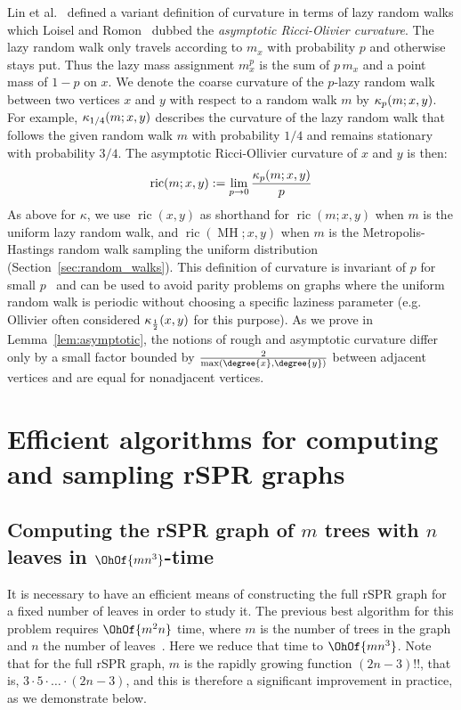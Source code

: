 \documentclass[11pt]{amsart}
\newcommand{\MH}{\operatorname{MH}}
\newcommand{\curvature}[2][]{%
    \ifthenelse{\equal{#1}{}}%
		{\kappa(#2)}%
		{\kappa_{#1}(#2)}%
}
\newcommand{\ric}[1]{
	\operatorname{ric}(#1)%
}
\begin{document}
Lin et al.~\cite{lin2011ricci} defined a variant definition of curvature in terms of lazy random walks which Loisel and Romon~\cite{Loisel2014-hu} dubbed the \emph{asymptotic Ricci-Olivier curvature}.
The lazy random walk only travels according to $m_x$ with probability $p$ and otherwise stays put.
Thus the lazy mass assignment $m^p_x$ is the sum of $p\, m_x$ and a point mass of $1 - p$ on $x$.
We denote the coarse curvature of the $p$-lazy random walk between two vertices $x$ and $y$ with respect to a random walk $m$ by $\curvature[p]{m; x,y}$.
For example, $\curvature[1/4]{m; x,y}$ describes the curvature of the lazy random walk that follows the given random walk $m$ with probability $1/4$ and remains stationary with probability $3/4$.
The asymptotic Ricci-Ollivier curvature of $x$ and $y$ is then:
\begin{equation}
\ric{m; x, y} := \lim_{p \rightarrow 0} \frac{\curvature[p]{m; x,y}}{p}
\label{eq:asympCurvatureDef}
\end{equation}
As above for $\kappa$, we use $\ric{x, y}$ as shorthand for $\ric{m; x, y}$ when $m$ is the uniform lazy random walk, and $\ric{\MH; x, y}$ when $m$ is the Metropolis-Hastings random walk sampling the uniform distribution (Section~\ref{sec:random_walks}).
This definition of curvature is invariant of $p$ for small $p$~\cite{Loisel2014-hu} and can be used to avoid parity problems on graphs where the uniform random walk is periodic without choosing a specific laziness parameter (e.g. Ollivier often considered $\curvature[\frac{1}{2}]{x,y}$ for this purpose).
As we prove in Lemma~\ref{lem:asymptotic}, the notions of rough and asymptotic curvature differ only by a small factor bounded by $\frac{2}{\max(\degree{x}, \degree{y})}$ between adjacent vertices and are equal for nonadjacent vertices.

\section{Efficient algorithms for computing and sampling rSPR graphs}

\subsection{Computing the rSPR graph of $m$ trees with $n$ leaves in $\OhOf{mn^3}$-time}
\label{sec:computing_treespace}

It is necessary to have an efficient means of constructing the full rSPR graph for a fixed number of leaves in order to study it.
The previous best algorithm for this problem requires $\OhOf{m^2 n}$ time, where $m$ is the number of trees in the graph and $n$ the number of leaves~\cite{Whidden2015-yi}.
Here we reduce that time to $\OhOf{mn^3}$.
Note that for the full rSPR graph, $m$ is the rapidly growing function $(2n-3)!!$, that is, $3 \cdot 5 \cdot \ldots \cdot (2n-3)$, and this is therefore a significant improvement in practice, as we demonstrate below.
\end{document}
